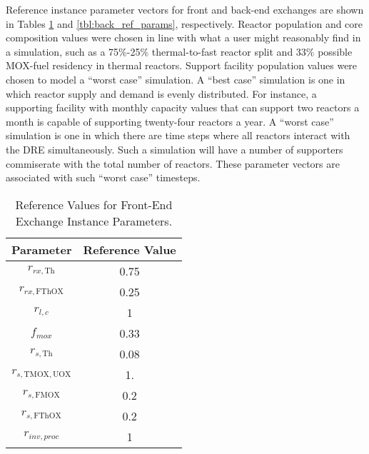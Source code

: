 Reference instance parameter vectors for front and back-end exchanges are shown
in Tables \ref{tbl:front_ref_params} and \ref{tbl:back_ref_params},
respectively. Reactor population and core composition values were chosen in line
with what a user might reasonably find in a simulation, such as a 75\%-25\%
thermal-to-fast reactor split and 33\% possible MOX-fuel residency in thermal
reactors. Support facility population values were chosen to model a ``worst
case'' simulation. A ``best case'' simulation is one in which reactor supply and
demand is evenly distributed. For instance, a supporting facility with monthly
capacity values that can support two reactors a month is capable of supporting
twenty-four reactors a year. A ``worst case'' simulation is one in which there
are time steps where all reactors interact with the DRE simultaneously. Such a
simulation will have a number of supporters commiserate with the total number of
reactors. These parameter vectors are associated with such ``worst case''
timesteps.

\begin{table}[h!]
\centering
\caption{Reference Values for Front-End Exchange Instance Parameters.}
\label{tbl:front_ref_params}
\begin{tabular}{|c|c|}
\hline
Parameter    & Reference Value
\\ \hline
$r_{rx, \text{Th}}$   & 0.75 
\\ \hline
$r_{rx, \text{FThOX}}$ & 0.25
\\ \hline
$r_{l, c}$ & 1
\\ \hline
$f_{mox}$     & 0.33
\\ \hline
$r_{s, \text{Th}}$ & 0.08
\\ \hline
$r_{s, \text{TMOX}, \text{UOX}}$ & 1.
\\ \hline
$r_{s, \text{FMOX}}$ & 0.2
\\ \hline
$r_{s, \text{FThOX}}$ & 0.2
\\ \hline
$r_{inv, proc}$   & 1
\\ \hline
\end{tabular}
\end{table}

